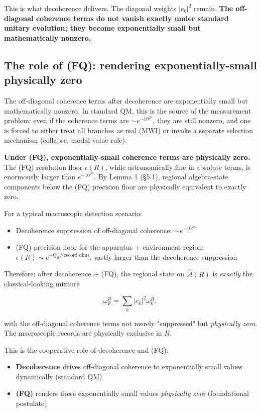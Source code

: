 \documentclass[11pt,a4paper]{article}
\begin{document}
This is what decoherence delivers. The diagonal weights $|c_k|^2$ remain. \textbf{The off-diagonal coherence terms do not vanish exactly under standard unitary evolution; they become exponentially small but mathematically nonzero.}

\subsection{The role of (FQ): rendering exponentially-small physically zero}

The off-diagonal coherence terms after decoherence are exponentially small but mathematically nonzero. In standard QM, this is the source of the measurement problem: even if the coherence terms are $\sim e^{-10^{20}}$, they are still nonzero, and one is forced to either treat all branches as real (MWI) or invoke a separate selection mechanism (collapse, modal value-rule).

\textbf{Under (FQ), exponentially-small coherence terms are physically zero.} The (FQ) resolution floor $\epsilon(R)$, while astronomically fine in absolute terms, is enormously larger than $e^{-10^{20}}$. By Lemma 1 (§5.1), regional algebra-state components below the (FQ) precision floor are physically equivalent to exactly zero.

For a typical macroscopic detection scenario:
\begin{itemize}
  \item Decoherence suppression of off-diagonal coherence: $\sim e^{-10^{20}}$
  \item (FQ) precision floor for the apparatus + environment region: $\epsilon(R) \sim e^{-Q_R/\text{(record dim)}}$, vastly larger than the decoherence suppression
\end{itemize}

Therefore: after decoherence + (FQ), the regional state on $\hat{\mathcal{A}}(R)$ is \emph{exactly} the classical-looking mixture

\[
\omega_\Psi^{R} = \sum_k |c_k|^2 \omega_k^R,
\]

with the off-diagonal coherence terms not merely "suppressed" but \emph{physically zero}. The macroscopic records are physically exclusive in $R$.

This is the cooperative role of decoherence and (FQ):
\begin{itemize}
  \item \textbf{Decoherence} drives off-diagonal coherence to exponentially small values dynamically (standard QM)
  \item \textbf{(FQ)} renders these exponentially small values \emph{physically zero} (foundational postulate)
\end{itemize}
\end{document}
